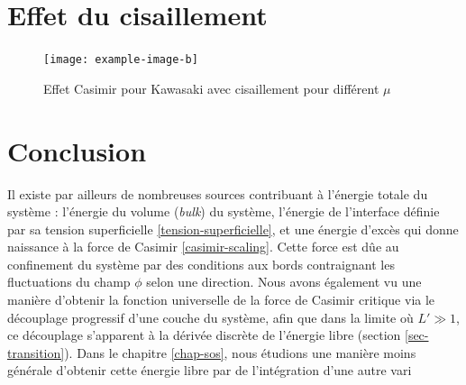 	
	\section{Effet du cisaillement}


\begin{figure}
    \centering
	\texttt{[image: example-image-b]}
	\caption{Effet Casimir pour Kawasaki avec cisaillement pour différent $\mu$}
\end{figure}

    \section{Conclusion}
	
	Il existe par ailleurs de nombreuses sources contribuant à l'énergie totale du système : l'énergie du volume (\textit{bulk}) du système, l'énergie de l'interface définie par sa tension superficielle \ref{tension-superficielle}, et une énergie d'excès qui donne naissance à la force de Casimir \ref{casimir-scaling}. Cette force est dûe au confinement du système par des conditions aux bords contraignant les fluctuations du champ $\phi$ selon une direction. 
Nous avons également vu une manière d'obtenir la fonction universelle de la force de Casimir critique via le découplage progressif d'une couche du système, afin que dans la limite où $L' \gg 1$, ce découplage s'apparent à la dérivée discrète de l'énergie libre (section \ref{sec-transition}). Dans le chapitre \ref{chap-sos}, nous étudions une manière moins générale d'obtenir cette énergie libre par de l'intégration d'une autre vari
